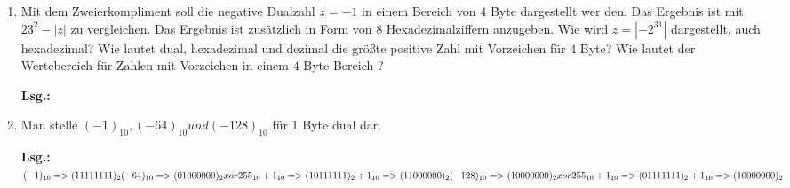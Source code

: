 \documentclass[12pt,a4paper]{scrreprt}
\newcommand{\Lsg}{\par \textbf{Lsg.: }}
\begin{document}
\begin{enumerate}
Die folgenden Zahlen sind mit dem Hornerschema in Dezimalzahlen zu konvertieren:

\begin{enumerate}
	\item $(0,375)_8$
	\item $(0,1210)_{10}$
	\item $(0,888)_9$
	\item $(0,ADDA)_{16}$
\end{enumerate}

\Lsg%

\item Mit dem Zweierkompliment soll die negative Dualzahl $z =-1$ in einem Bereich von $4$ Byte dargestellt wer den. Das Ergebnis ist mit $23^2-|z|$ zu vergleichen. Das Ergebnis ist zusätzlich in Form von $8$ Hexadezimalziffern anzugeben. Wie wird $z=|-2^31|$ dargestellt, auch hexadezimal?
Wie lautet dual, hexadezimal und dezimal die größte positive Zahl mit Vorzeichen für $4$ Byte? Wie lautet der Wertebereich für Zahlen mit Vorzeichen in einem $4$ Byte Bereich ?

\Lsg%

\item Man stelle $(-1)_{10}, (-64)_{10} und (-128)_{10}$ für $1$ Byte dual dar. \\

\Lsg\begin{math}
      (-1)_{10} => (11111111)_2 \\
     (-64)_{10} => (01000000)_2 xor 255_{10} + 1_{10} \\ => (10111111)_2 + 1_{10} => (11000000)_2 \\
    (-128)_{10} => (10000000)_2 xor 255_{10} + 1_{10} \\ => (01111111)_2 + 1_{10} => (10000000)_2 
\end{math}

\end{enumerate}
\end{document}
